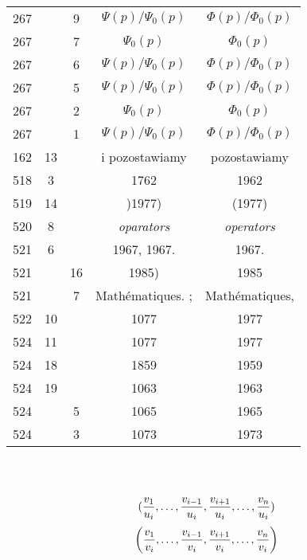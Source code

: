 \documentclass[a4paper,11pt]{article}
\begin{document}
\begin{center}
\begin{tabular}{|c|c|c|c|c|}
    267 & &  9 & $\Psi( p ) / \Psi_{ 0 }( p )$
           & $\Phi( p ) / \Phi_{ 0 }( p )$ \\
    267 & &  7 & $\Psi_{ 0 }( p )$ & $\Phi_{ 0 }( p )$ \\
    267 & &  6 & $\Psi( p ) / \Psi_{ 0 }( p )$
           & $\Phi( p ) / \Phi_{ 0 }( p )$ \\
    267 & &  5 & $\Psi( p ) / \Psi_{ 0 }( p )$
           & $\Phi( p ) / \Phi_{ 0 }( p )$ \\
    267 & &  2 & $\Psi_{ 0 }( p )$ & $\Phi_{ 0 }( p )$ \\
    267 & &  1 & $\Psi( p ) / \Psi_{ 0 }( p )$
           & $\Phi( p ) / \Phi_{ 0 }( p )$ \\
    162 & 13 & & i pozostawiamy & pozostawiamy \\
    518 &  3 & & 1762 & 1962 \\
    519 & 14 & & )1977) & (1977) \\
    520 &  8 & & \emph{oparators} & \emph{operators} \\
    521 &  6 & & 1967, 1967. & 1967. \\
    521 & & 16 & 1985) & 1985 \\
    521 & &  7 & Math\'{e}matiques. ; & Math\'{e}matiques, \\
    522 & 10 & & 1077 & 1977 \\
    524 & 11 & & 1077 & 1977 \\
    524 & 18 & & 1859 & 1959 \\
    524 & 19 & & 1063 & 1963 \\
    524 & &  5 & 1065 & 1965 \\
    524 & &  3 & 1073 & 1973 \\
    \hline
  \end{tabular}

\end{center}
\noi \\
 \\
\Jest %
\begin{equation*}
  ( \frac{ v_{ 1 } }{ u_{ i } }, \ldots, \frac{ v_{ i - 1 } }{ u_{ i } },
  \frac{ v_{ i + 1 } }{ u_{ i } }, \ldots, \frac{ v_{ n } }{ u_{ i } } )
\end{equation*}
\Pow
\begin{equation*}
  \left( \frac{ v_{ 1 } }{ v_{ i } }, \ldots, \frac{ v_{ i - 1 } }{ v_{ i } },
    \frac{ v_{ i + 1 } }{ v_{ i } }, \ldots, \frac{ v_{ n } }{ v_{ i } } \right)
\end{equation*}
\end{document}
